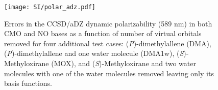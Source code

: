 \begin{figure}
  \centering
  \texttt{[image: SI/polar\_adz.pdf]}
  \caption{Errors in the CCSD/aDZ dynamic polarizability (589
nm) in both CMO and NO bases as a function of number of virtual orbitals
removed for four additional test cases: (\textit{P})-dimethylallene (DMA),
   (\textit{P})-dimethylallene and one water molecule (DMA1w), (\textit{S})-Methyloxirane
(MOX), and (\textit{S})-Methyloxirane and two water molecules with one of the water
molecules removed leaving only its basis functions.}
   \label{fig:polar_adz}
\end{figure}
